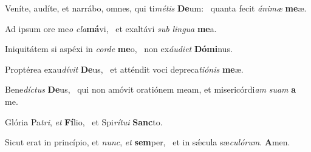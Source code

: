\item Veníte, audíte, et narrábo, omnes, qui ti\textit{métis} \textbf{De}um:~\psstar{} quanta fecit \textit{ánimæ} \textbf{me}æ.
\item Ad ipsum ore me\textit{o} \textit{cla}\textbf{má}vi,~\psstar{} et exaltávi \textit{sub} \textit{lingua} \textbf{me}a.
\item Iniquitátem si aspéxi in \textit{corde} \textbf{me}o,~\psstar{} non ex\textit{áudiet} \textbf{Dó}\textbf{mi}nus.
\item Proptérea exau\textit{dívit} \textbf{De}us,~\psstar{} et atténdit voci depreca\textit{tiónis} \textbf{me}æ.
\item Bene\textit{díctus} \textbf{De}us,~\psstar{} qui non amóvit oratiónem meam, et misericórdi\textit{am} \textit{suam} \textbf{a} me.
\item Glória Pa\textit{tri}, \textit{et} \textbf{Fí}lio,~\psstar{} et Spi\textit{rítui} \textbf{Sanc}to.
\item Sicut erat in princípio, et \textit{nunc}, \textit{et} \textbf{sem}per,~\psstar{} et in sǽcula sæ\textit{culórum}. \textbf{A}men.
